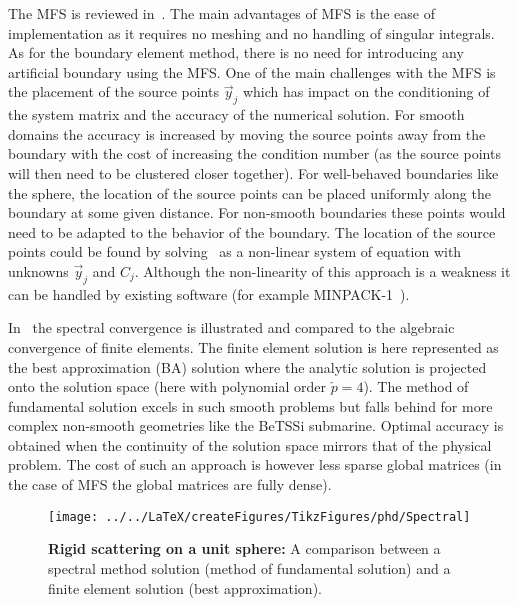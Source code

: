 The MFS is reviewed in~\cite{Fairweather2003tmo}. The main advantages of MFS is the ease of implementation as it requires no meshing and no handling of singular integrals. As for the boundary element method, there is no need for introducing any artificial boundary using the MFS. One of the main challenges with the MFS is the placement of the source points $\vec{y}_j$ which has impact on the conditioning of the system matrix and the accuracy of the numerical solution. For smooth domains the accuracy is increased by moving the source points away from the boundary with the cost of increasing the condition number (as the source points will then need to be clustered closer together). For well-behaved boundaries like the sphere, the location of the source points can be placed uniformly along the boundary at some given distance. For non-smooth boundaries these points would need to be adapted to the behavior of the boundary. The location of the source points could be found by solving~ as a non-linear system of equation with unknowns $\vec{y}_j$ and $C_j$. Although the non-linearity of this approach is a weakness it can be handled by existing software (for example MINPACK-1~\cite{More1980ugf}).

In~ the spectral convergence is illustrated and compared to the algebraic convergence of finite elements. The finite element solution is here represented as the best approximation (BA) solution where the analytic solution is projected onto the solution space (here with polynomial order $\check{p}=4$). The method of fundamental solution excels in such smooth problems but falls behind for more complex non-smooth geometries like the BeTSSi submarine. Optimal accuracy is obtained when the continuity of the solution space mirrors that of the physical problem. The cost of such an approach is however less sparse global matrices (in the case of MFS the global matrices are fully dense).
\begin{figure}
	\centering
	\texttt{[image: ../../LaTeX/createFigures/TikzFigures/phd/Spectral]}
	\caption{\textbf{Rigid scattering on a unit sphere:} A comparison between a spectral method solution (method of fundamental solution) and a finite element solution (best approximation).}
	\label{Fig:Spectral}
\end{figure}

